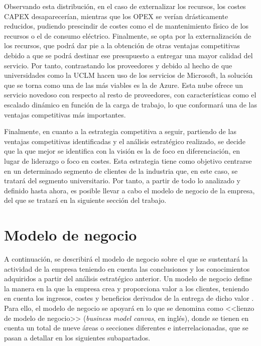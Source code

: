 Observando esta distribución, en el caso de externalizar los recursos, los costes \acs{CAPEX} desaparecerían, mientras que los \acs{OPEX} se verían drásticamente reducidos, pudiendo prescindir de costes como el de mantenimiento físico de los recursos o el de consumo eléctrico. Finalmente, se opta por la externalización de los recursos, que podrá dar pie a la obtención de otras ventajas competitivas debido a que se podrá destinar ese presupuesto a entregar una mayor calidad del servicio. Por tanto, contrastando los proveedores y debido al hecho de que universidades como la \acs{UCLM} hacen uso de los servicios de Microsoft, la solución que se torna como una de las más viables es la de Azure. Esta nube ofrece un servicio novedoso con respecto al resto de proveedores, con características como el escalado dinámico en función de la carga de trabajo, lo que conformará una de las ventajas competitivas más importantes.

Finalmente, en cuanto a la estrategia competitiva a seguir, partiendo de las ventajas competitivas identificadas y el análisis estratégico realizado, se decide que la que mejor se identifica con la visión es la de foco en diferenciación, en lugar de liderazgo o foco en costes. Esta estrategia tiene como objetivo centrarse en un determinado segmento de clientes de la industria que, en este caso, se tratará del segmento universitario. Por tanto, a partir de todo lo analizado y definido hasta ahora, es posible llevar a cabo el modelo de negocio de la empresa, del que se tratará en la siguiente sección del trabajo.


\clearpage


\section{Modelo de negocio}
A continuación, se describirá el modelo de negocio sobre el que se sustentará la actividad de la empresa teniendo en cuenta las conclusiones y los conocimientos adquiridos a partir del análisis estratégico anterior. Un modelo de negocio define la manera en la que la empresa crea y proporciona valor a los clientes, teniendo en cuenta los ingresos, costes y beneficios derivados de la entrega de dicho valor \cite{Teece2010BusinessInnovation}. Para ello, el modelo de negocio se apoyará en lo que se denomina como <<lienzo de modelo de negocio>> (\textit{business model canvas}, en inglés), donde se tienen en cuenta un total de nueve áreas o secciones diferentes e interrelacionadas, que se pasan a detallar en los siguientes subapartados.


